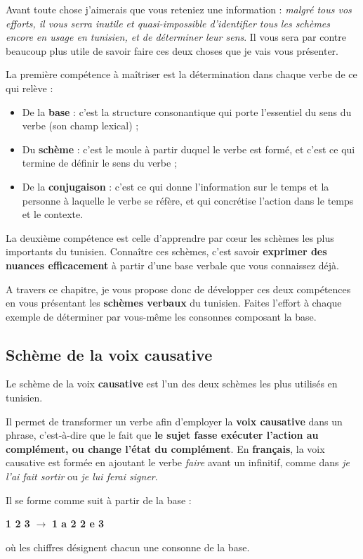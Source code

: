 Avant toute chose j'aimerais que vous reteniez une information : \textit{malgré tous vos efforts, il vous serra inutile et quasi-impossible d'identifier tous les schèmes encore en usage en tunisien, et de déterminer leur sens}. Il vous sera par contre beaucoup plus utile de savoir faire ces deux choses que je vais vous présenter. 

La première compétence à maîtriser est la détermination dans chaque verbe  de ce qui relève : 
\begin{itemize}
    \item De la \textbf{base} : c'est la structure consonantique qui porte l'essentiel du sens du verbe (son champ lexical) ; 
    \item Du \textbf{schème} : c'est le moule à partir duquel le verbe est formé, et c'est ce qui termine de définir le sens du verbe ; 
    \item De la \textbf{conjugaison} : c'est ce qui donne l'information sur le temps et la personne à laquelle le verbe se réfère, et qui concrétise l'action dans le temps et le contexte.
\end{itemize}

La deuxième compétence est celle d'apprendre par c\oe ur les schèmes les plus importants du tunisien. Connaître ces schèmes, c'est savoir \textbf{exprimer des nuances efficacement} à partir d'une base verbale que vous connaissez déjà. 

A travers ce chapitre, je vous propose donc de développer ces deux compétences en vous présentant les \textbf{schèmes verbaux} du tunisien. Faites l'effort à chaque exemple de déterminer par vous-même les consonnes composant la base. 

\subsection{Schème de la voix causative}
Le schème de la voix \textbf{causative} est l'un des deux schèmes les plus utilisés en tunisien.

Il permet de transformer un verbe afin d'employer la \textbf{voix causative} dans un phrase, c'est-à-dire que le fait que \textbf{le sujet fasse exécuter l'action au complément, ou change l'état du complément}. En \textbf{français}, la voix causative est formée en ajoutant le verbe \textit{faire} avant un infinitif, comme dans \textit{je l'ai fait sortir} ou \textit{je lui ferai signer}.

Il se forme comme suit à partir de la base : 
\begin{center}
    \Large{\textbf{1 2 3} $\rightarrow$ \textbf{1 a 2 2 e 3}}
\end{center}
où les chiffres désignent chacun une consonne de la base.

